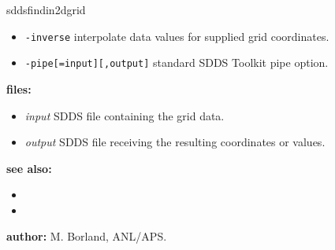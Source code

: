 \begin{sddsprog}{sddsfindin2dgrid}
\begin{itemize}
    \item \verb|-inverse| \textendash{} interpolate data values for supplied grid coordinates.
    \item \verb+-pipe[=input][,output]+ \textendash{} standard SDDS Toolkit pipe option.
  \end{itemize}
  \item \textbf{files:}
  \begin{itemize}
    \item \emph{input} \textendash{} SDDS file containing the grid data.
    \item \emph{output} \textendash{} SDDS file receiving the resulting coordinates or values.
  \end{itemize}
  \item \textbf{see also:}
  \begin{itemize}
    \item {}
    \item {}
  \end{itemize}
  \item \textbf{author:} M. Borland, ANL/APS.
\end{sddsprog}
